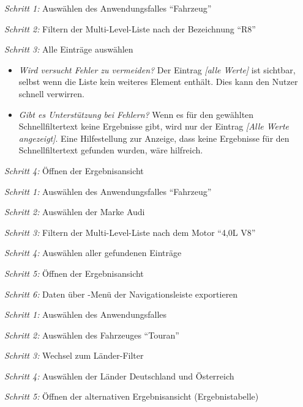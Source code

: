 \textit{Schritt 1:} Auswählen des Anwendungsfalles \enquote{Fahrzeug}\par
\textit{Schritt 2:} Filtern der Multi-Level-Liste nach der Bezeichnung \enquote{R8}\par
\textit{Schritt 3:} Alle Einträge auswählen\par
\begin{itemize}
 \item \textit{Wird versucht Fehler zu vermeiden?} Der Eintrag \textit{[alle Werte]} ist sichtbar, selbst wenn die Liste kein weiteres Element enthält. Dies kann den Nutzer schnell verwirren.\par
 \item \textit{Gibt es Unterstützung bei Fehlern?} Wenn es für den gewählten Schnellfiltertext keine Ergebnisse gibt, wird nur der Eintrag \textit{[Alle Werte angezeigt]}. Eine Hilfestellung zur Anzeige, dass keine Ergebnisse für den Schnellfiltertext gefunden wurden, wäre hilfreich.\par
\end{itemize}
\textit{Schritt 4:} Öffnen der Ergebnisansicht\par
{}\par
\textit{Schritt 1:} Auswählen des Anwendungsfalles \enquote{Fahrzeug}\par
\textit{Schritt 2:} Auswählen der Marke Audi\par
\textit{Schritt 3:} Filtern der Multi-Level-Liste nach dem Motor \enquote{4,0L V8}\par
\textit{Schritt 4:} Auswählen aller gefundenen Einträge\par
\textit{Schritt 5:} Öffnen der Ergebnisansicht\par
\textit{Schritt 6:} Daten über -Menü der Navigationsleiste exportieren\par
{}\par
\textit{Schritt 1:} Auswählen des Anwendungsfalles\par
\textit{Schritt 2:} Auswählen des Fahrzeuges \enquote{Touran}\par
\textit{Schritt 3:} Wechsel zum Länder-Filter\par
\textit{Schritt 4:} Auswählen der Länder Deutschland und Österreich\par
\textit{Schritt 5:} Öffnen der alternativen Ergebnisansicht (Ergebnistabelle)\par
